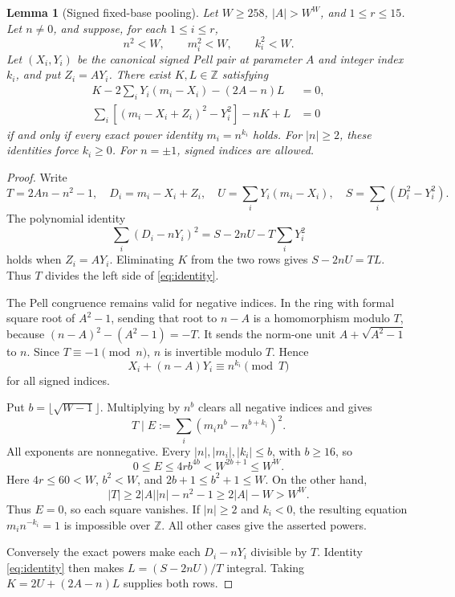 \documentclass[11pt,letterpaper]{article}
\newtheorem{lemma}[theorem]{Lemma}
\theoremstyle{remark}
\newcommand{\Z}{\mathbb Z}
\begin{document}
\begin{lemma}[Signed fixed-base pooling]\label{lem:pool}
Let \(W\ge258\), \(|A|>W^W\), and \(1\le r\le15\).
Let \(n\ne0\), and suppose, for each \(1\le i\le r\),
\[
 n^2<W,\qquad m_i^2<W,\qquad k_i^2<W.
\]
Let \((X_i,Y_i)\) be the canonical signed Pell pair at parameter
\(A\) and integer index \(k_i\), and put \(Z_i=AY_i\).
There exist \(K,L\in\Z\) satisfying
\begin{align}
 K-2\sum_iY_i(m_i-X_i)-(2A-n)L&=0,\label{eq:pool1}\\
 \sum_i[(m_i-X_i+Z_i)^2-Y_i^2]-nK+L&=0\label{eq:pool2}
\end{align}
if and only if every exact power identity \(m_i=n^{k_i}\) holds.
For \(|n|\ge2\), these identities force \(k_i\ge0\).
For \(n=\pm1\), signed indices are allowed.
\end{lemma}
\begin{proof}
Write
\[
 T=2An-n^2-1,\quad D_i=m_i-X_i+Z_i,\quad
 U=\sum_iY_i(m_i-X_i),\quad S=\sum_i(D_i^2-Y_i^2).
\]
The polynomial identity
\begin{equation}\label{eq:identity}
 \sum_i(D_i-nY_i)^2=S-2nU-T\sum_iY_i^2
\end{equation}
holds when \(Z_i=AY_i\). Eliminating \(K\) from the two rows gives
\(S-2nU=TL\). Thus \(T\) divides the left side of
\eqref{eq:identity}.

The Pell congruence remains valid for negative indices. In the ring
with formal square root of \(A^2-1\), sending that root to \(n-A\)
is a homomorphism modulo \(T\), because
\((n-A)^2-(A^2-1)=-T\). It sends the norm-one unit
\(A+\sqrt{A^2-1}\) to \(n\). Since \(T\equiv-1\pmod n\),
\(n\) is invertible modulo \(T\). Hence
\[
 X_i+(n-A)Y_i\equiv n^{k_i}\pmod T
\]
for all signed indices.

Put \(b=\lfloor\sqrt{W-1}\rfloor\). Multiplying by \(n^b\)
clears all negative indices and gives
\[
 T\mid E:=\sum_i(m_i n^b-n^{b+k_i})^2.
\]
All exponents are nonnegative. Every
\(|n|,|m_i|,|k_i|\le b\), with \(b\ge16\), so
\[
 0\le E\le4r b^{4b}<W^{2b+1}\le W^W.
\]
Here \(4r\le60<W\), \(b^2<W\), and
\(2b+1\le b^2+1\le W\). On the other hand,
\[
 |T|\ge2|A||n|-n^2-1\ge2|A|-W>W^W.
\]
Thus \(E=0\), so each square vanishes. If \(|n|\ge2\) and
\(k_i<0\), the resulting equation \(m_i n^{-k_i}=1\) is
impossible over \(\Z\). All other cases give the asserted powers.

Conversely the exact powers make each \(D_i-nY_i\) divisible
by \(T\). Identity \eqref{eq:identity} then makes
\(L=(S-2nU)/T\) integral. Taking \(K=2U+(2A-n)L\)
supplies both rows.
\end{proof}
\end{document}
